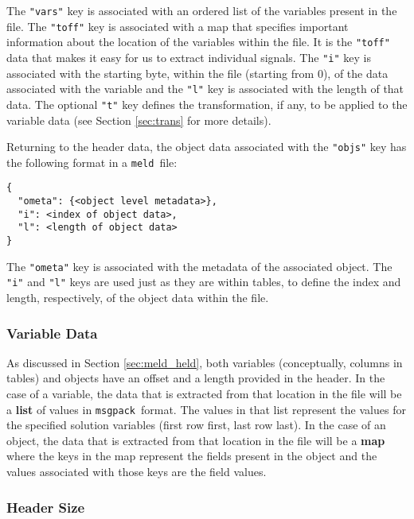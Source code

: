 \documentclass[11pt,a4paper,twocolumn]{article}
\newcommand{\meld}{\texttt{meld}}
\newcommand{\msgpack}{\texttt{msgpack}}
\newcommand{\code}[1]{\texttt{#1}} %
\begin{document}
The \code{"vars"} key is associated with an ordered list of the
variables present in the file.  The \code{"toff"} key is associated
with a map that specifies important information about the location of
the variables within the file.  It is the \code{"toff"} data that
makes it easy for us to extract individual signals.  The \code{"i"}
key is associated with the starting byte, within the file (starting
from 0), of the data associated with the variable and the \code{"l"}
key is associated with the length of that data.  The optional
\code{"t"} key defines the transformation, if any, to be applied to
the variable data (see Section \ref{sec:trans} for more details).

Returning to the header data, the object data associated with the
\code{"objs"} key has the following format in a \meld\ file:

\begin{verbatim}
{
  "ometa": {<object level metadata>},
  "i": <index of object data>,
  "l": <length of object data>
}
\end{verbatim}

The \code{"ometa"} key is associated with the metadata of the
associated object.  The \code{"i"} and \code{"l"} keys are used just
as they are within tables, to define the index and length,
respectively, of the object data within the file.

\subsubsection{Variable Data}

As discussed in Section \ref{sec:meld_held}, both variables
(conceptually, columns in tables) and objects have an offset and a
length provided in the header.  In the case of a variable, the data
that is extracted from that location in the file will be a
\textbf{list} of values in \msgpack\ format.  The values in that list
represent the values for the specified solution variables (first row
first, last row last).  In the case of an object, the data that is
extracted from that location in the file will be a \textbf{map} where
the keys in the map represent the fields present in the object and the
values associated with those keys are the field values.

\subsubsection{Header Size}

\end{document}
